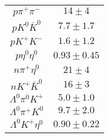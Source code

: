 \begin{table}
{\begin{tabular}{|c|c|}
			$ p \pi^{+} \pi^{-}  $ & $      14 \pm      4 $ \\
			$ p K^{0} \bar{K}^{0}  $ & $     7.7 \pm     1.7 $ \\
			$ p K^{+} K^{-}  $ & $     1.6 \pm     1.2 $ \\
			$ p \eta^{0} \eta^{0}  $ & $      0.93 \pm      0.45 $ \\
			$ n \pi^{+} \eta^{0}  $ & $     21 \pm      4 $ \\
			$ n K^{+} \bar{K}^{0}  $ & $     16 \pm      3 $ \\
			$ \Lambda^{0} \pi^{0} K^{+}  $ & $      5.0 \pm      1.0 $ \\
			$ \Lambda^{0} \pi^{+} K^{0}  $ & $    9.7 \pm      2.0 $ \\
			$ \Lambda^{0} K^{+} \eta^{0}  $ & $     0.90 \pm      0.22 $ \\
			
			\hline
		\end{tabular}
	}
\end{table}

